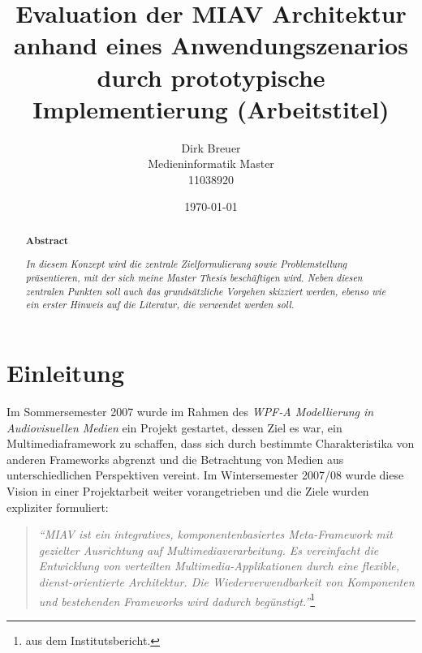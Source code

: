\documentclass[11pt,headsepline,a4paper,bibtotoc,liststotoc,DIV12,BCOR12mm]{scrartcl}
\title{Evaluation der MIAV Architektur anhand eines Anwendungszenarios durch prototypische Implementierung (Arbeitstitel)}
\author{Dirk Breuer\\Medieninformatik Master\\11038920}
\date{\today}
\begin{document}
  
\dosecttoc

\ifpdf
{}
\else
{}
\fi

\maketitle

\begin{abstract}
  \begin{center}
    \textbf{Abstract\\}
    \vspace{.3cm}
  \end{center}
  \emph{In diesem Konzept wird die zentrale Zielformulierung sowie Problemstellung präsentieren, mit der sich meine Master Thesis beschäftigen wird. Neben diesen zentralen Punkten soll auch das grundsätzliche Vorgehen skizziert werden, ebenso wie ein erster Hinweis auf die Literatur, die verwendet werden soll.}
\end{abstract}
  



\section{Einleitung} %
\label{sec:einleitung}

  Im Sommersemester 2007 wurde im Rahmen des \emph{WPF-A Modellierung in Audiovisuellen Medien} ein Projekt gestartet, dessen Ziel es war, ein Multimediaframework zu schaffen, dass sich durch bestimmte Charakteristika von anderen Frameworks abgrenzt und die Betrachtung von Medien aus unterschiedlichen Perspektiven vereint. Im Wintersemester 2007/08 wurde diese Vision in einer Projektarbeit weiter vorangetrieben und die Ziele wurden expliziter formuliert:
  
  \begin{quote}
    \emph{"`MIAV ist ein integratives, komponentenbasiertes Meta-Framework mit gezielter Ausrichtung auf Multimediaverarbeitung. Es vereinfacht die Entwicklung von verteilten Multimedia-Applikationen durch eine flexible, dienst-orientierte Architektur. Die Wiederverwendbarkeit von Komponenten und bestehenden Frameworks wird dadurch begünstigt."'}\footnote{aus dem Institutsbericht.}
  \end{quote}
  
\end{document}
